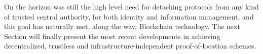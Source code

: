 On the horizon was still the high level need for detaching \pol{} protocols from any kind of trusted central authority, for both identity and information management, and this goal has naturally met, along the way, Blockchain technology. The next Section will finally present the most recent developments in achieving decentralized, trustless and infrastructure-independent proof-of-location schemes.
